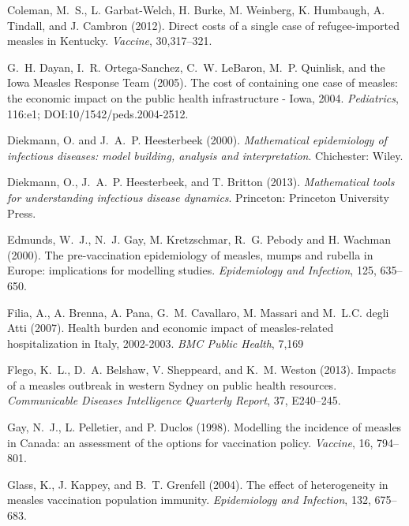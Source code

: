 \documentclass{article}
\begin{document}
\begin{itemize}
\begin{thebibliography}{}
Coleman, M.~S., L. Garbat-Welch, H. Burke, M. Weinberg, K. Humbaugh, A. Tindall, and J. Cambron (2012).
\newblock Direct costs of a single case of refugee-imported measles in Kentucky.
\newblock \emph{Vaccine}, 30,317--321.

G.~H. Dayan, I.~R. Ortega-Sanchez, C.~W. LeBaron, M.~P. Quinlisk, and the Iowa Measles Response Team (2005).
\newblock The cost of containing one case of measles: the economic impact on the public health infrastructure - Iowa, 2004.
\newblock \emph{Pediatrics}, 116:e1; DOI:10/1542/peds.2004-2512.

Diekmann, O. and  J.~A.~P. Heesterbeek (2000).
\newblock \emph{Mathematical epidemiology of infectious diseases: model building, analysis and interpretation}.
Chichester: Wiley.

Diekmann, O.,  J.~A.~P. Heesterbeek, and T. Britton (2013).
\newblock \emph{Mathematical tools for understanding infectious disease dynamics}.
Princeton: Princeton University Press.

Edmunds, W.~J., N.~J. Gay, M. Kretzschmar, R.~G. Pebody and H. Wachman (2000).
\newblock The pre-vaccination epidemiology of measles, mumps and rubella in Europe: implications for modelling studies.
\newblock \emph{Epidemiology and Infection}, 125, 635--650.

Filia, A., A. Brenna, A. Pana, G.~M. Cavallaro, M. Massari and M.~L.C. degli Atti (2007).
\newblock Health burden and economic impact of measles-related hospitalization in Italy, 2002-2003.
\newblock \emph{BMC Public Health}, 7,169

Flego, K.~L., D.~A. Belshaw, V. Sheppeard, and K.~M. Weston (2013).
\newblock Impacts of a measles outbreak in western Sydney on public health resources.
\newblock \emph{Communicable Diseases Intelligence Quarterly Report}, 37, E240--245.

Gay, N.~J., L. Pelletier, and P. Duclos (1998).
\newblock Modelling the incidence of measles in Canada: an assessment of the options for vaccination policy.
\newblock \emph{Vaccine}, 16, 794--801.

Glass, K., J. Kappey, and B.~T. Grenfell (2004).
\newblock The effect of heterogeneity in measles vaccination population immunity.
\newblock \emph{Epidemiology and Infection}, 132, 675--683.


\end{thebibliography}
\end{itemize}
\end{document}
